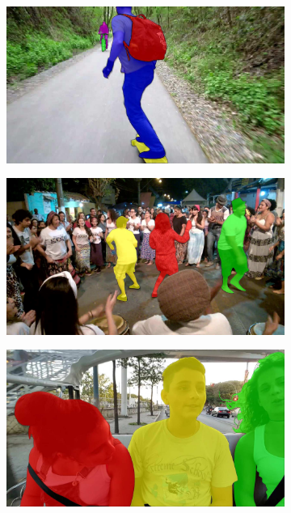 \begin{figure}[h]
  \centering
  \begin{subfigure}{.25\textwidth}
    \includegraphics[width=1.\linewidth]{figures/davis_dataset/image_1.jpg}
  \end{subfigure}%
  \begin{subfigure}{.25\textwidth}
    \includegraphics[width=1.\linewidth]{figures/davis_dataset/image_2.jpg}
  \end{subfigure}%
  \begin{subfigure}{.25\textwidth}
    \includegraphics[width=1.\linewidth]{figures/davis_dataset/image_3.jpg}

\end{subfigure}
\end{figure}
